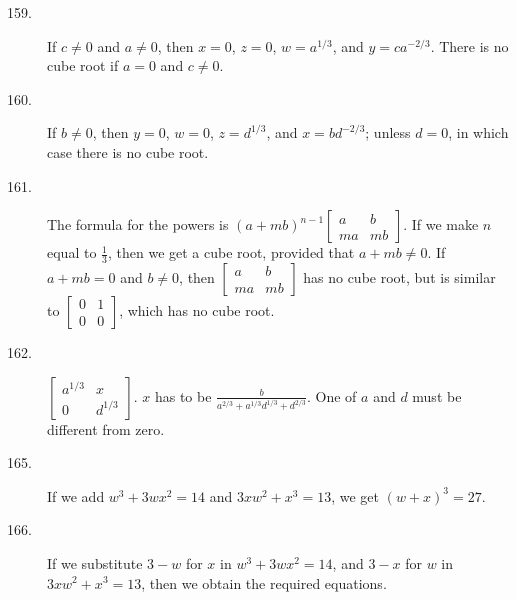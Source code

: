 \documentclass{article}
\begin{document}
\begin{description}

  \item[159.] If $c \neq 0$ and $a \neq 0$, then $x=0$, $z=0$, $w = a^{1/3}$, and $y = ca^{-2/3}$. There is no cube root if $a=0$ and $c \neq 0$.

  \item[160.] If $b \neq 0$, then $y=0$, $w=0$, $z = d^{1/3}$, and $x = bd^{-2/3}$; unless $d=0$, in which case there is no cube root.

  \item[161.] The formula for the powers is $(a+mb)^{n-1}  \begin{bmatrix} a & b \\ ma & mb \end{bmatrix}$. If we make $n$ equal to $\frac{1}{3}$, then we get a cube root, provided that $a+mb \neq 0$. If $a+mb=0$ and $b \neq 0$, then $\begin{bmatrix} a & b \\ ma & mb \end{bmatrix}$ has no cube root, but is similar to $\begin{bmatrix} 0 & 1 \\ 0 & 0 \end{bmatrix}$, which has no cube root.

  \item[162.] $\begin{bmatrix} a^{1/3} & x \\ 0 & d^{1/3} \end{bmatrix}$. $x$ has to be $\frac{b}{ a^{2/3} + a^{1/3} d^{1/3} + d^{2/3} }$. One of $a$ and $d$ must be different from zero.

  \item[165.] If we add $w^3 + 3wx^2 = 14$ and $3xw^2 + x^3 = 13$, we get $(w+x)^3 = 27$.

  \item[166.] If we substitute $3-w$ for $x$ in $w^3 + 3wx^2 = 14$, and $3-x$ for $w$ in $3xw^2 + x^3 = 13$, then we obtain the required equations.

\end{description}
\end{document}
